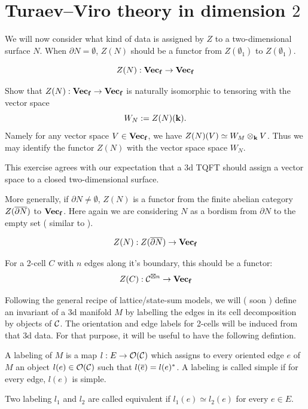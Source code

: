 \section{Turaev--Viro theory in dimension $2$}\label{s:tv-dim2}

We will now consider what kind of data is assigned by $Z$ to a two-dimensional surface $N$. When
 $\partial N = \emptyset$, $Z(N)$ should be a functor from $Z(\emptyset_1)$ to $Z(\emptyset_1)$.

\[ 
Z(N): \mathbf{Vec_f} \rightarrow \mathbf{Vec_f}
\]

\begin{exercise}
	Show that $Z(N): \mathbf{Vec_f} \rightarrow \mathbf{Vec_f}$ is naturally isomorphic to tensoring with the vector space 
	$$ W_N := Z(N)(\mathbf{k}).$$ Namely for any vector space $V \in \mathbf{Vec_f}$, we have $Z(N)(V) \simeq W_M \otimes_{\mathbf{k}} V$. 
	Thus we may identify the functor $Z(N)$ with the vector space space $W_N$.
\end{exercise}

This exercise agrees with our expectation that a 3d TQFT should assign a vector space to a closed two-dimensional surface.


More generally, if $\partial N \ne \emptyset$, $Z(N)$ is a functor from the finite abelian category $Z(\overline{\partial  N})$ 
to $\mathbf{Vec_f}$. Here again we are considering $N$ as a bordism from $\partial N$ to the empty set ( similar to  ).

\[
Z(N): Z(\overline{\partial  N}) \rightarrow \mathbf{Vec_f}
\]


For a 2-cell $C$ with $n$ edges along it's boundary, this should be a functor:
\[
Z(C):\mathcal{C}^{\boxtimes n}\to \mathbf{Vec_f}
\]


Following the general recipe of lattice/state-sum models, 
we will ( soon ) define an invariant of a 3d manifold $M$ by labelling the edges in its cell decomposition by objects of $\mathcal{C}$.
The orientation and edge labels for 2-cells will be induced from that 3d data. For that purpose, it will be useful to have the 
following defintion.

\begin{definition}
	A labeling of $M$ is a map $l:E \rightarrow \mathcal{O}(\mathcal{C}) $ which assigns to every oriented edge $e$ of $M$ an object $l(e) \in \mathcal{O}(\mathcal{C})$ 
	such that $l(\overline{e})=l(e)^*$. A labeling is called simple if for every edge, $l(e)$ is simple.
	
	Two labeling $l_1$ and $l_2$ are called equivalent if $l_1(e) \simeq l_2(e)$ for every $e \in E$.

\end{definition}


